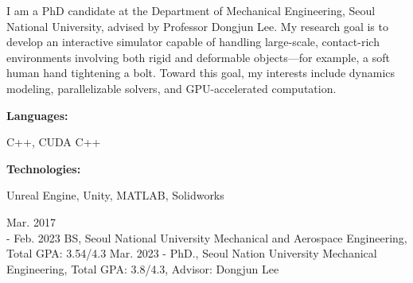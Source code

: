 \documentclass[9pt]{developercv} %
\begin{document}
\begin{minipage}[t]{0.46\textwidth}
	\vspace{-6pt}

I am a PhD candidate at the Department of Mechanical Engineering, Seoul National University, advised by Professor Dongjun Lee. My research goal is to develop an interactive simulator capable of handling large-scale, contact-rich environments involving both rigid and deformable objects—for example, a soft human hand tightening a bolt. Toward this goal, my interests include dynamics modeling, parallelizable solvers, and GPU-accelerated computation.

\end{minipage}
\hfill %
\begin{minipage}[t]{0.465\textwidth}
    \vspace{-6pt}
    
    \begin{minipage}[t]{0.2\textwidth}
        \textbf{Languages:}
    \end{minipage}
    \hfill
    \begin{minipage}[t]{0.73\textwidth}
      C++, CUDA C++
    \end{minipage}
    \vspace{4mm}
    
    \begin{minipage}[t]{0.2\textwidth}
        \textbf{Technologies:}
    \end{minipage}
    \hfill
    \begin{minipage}[t]{0.73\textwidth}
      Unreal Engine, Unity, MATLAB, Solidworks
    \end{minipage}
    
\end{minipage}

\vspace{-10 pt}
\begin{entrylist}
    \entry
		{Mar. 2017\\ - Feb. 2023}
		{BS, Seoul National University}
		{}
		{Mechanical and Aerospace Engineering, Total GPA: 3.54/4.3}
    \entry
		{Mar. 2023 -}
		{PhD., Seoul Nation University}
		{}
		{Mechanical Engineering, Total GPA: 3.8/4.3, Advisor: Dongjun Lee}
\end{entrylist}
\end{document}
